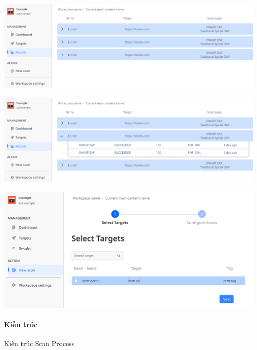 \includegraphics[width=\textwidth]{images/prototype/prototype_25102022/dashboard_result.png}

\vspace{1cm}

\includegraphics[width=\textwidth]{images/prototype/prototype_25102022/dashboard_result_opening-sub.png}

\vspace{1cm}

\includegraphics[width=\textwidth]{images/prototype/prototype_22112022/dashboad_new scan_select target.png}

\vspace{1cm}

\paragraph{Kiến trúc}
\tab Kiến trúc Scan Process
\vspace{3cm}

